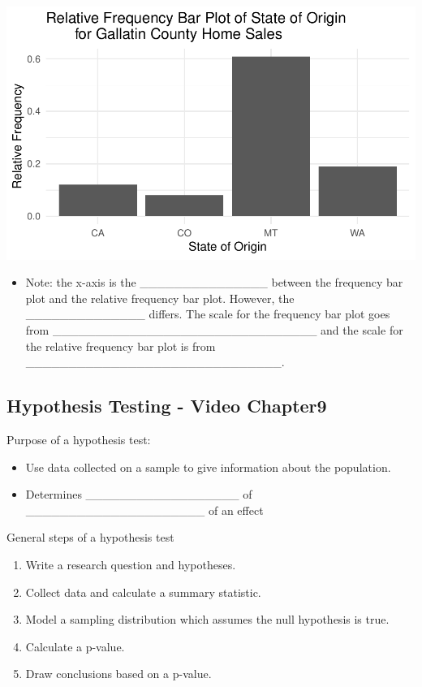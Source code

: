 \documentclass[
]{report}
\providecommand{\tightlist}{%
  \setlength{\itemsep}{0pt}\setlength{\parskip}{0pt}}
\begin{document}
\begin{center}\includegraphics[width=0.65\linewidth]{03-VN03-EDA_OneCatSimulation_files/figure-latex/unnamed-chunk-6-1} \end{center}


\begin{itemize}
\tightlist
\item
  Note: the x-axis is the \_\_\_\_\_\_\_\_\_\_\_\_\_\_\_ between the frequency bar plot and the relative frequency bar plot. However, the \_\_\_\_\_\_\_\_\_\_\_\_\_\_ differs. The scale for the frequency bar plot goes from \_\_\_\_\_\_\_\_\_\_\_\_\_\_\_\_\_\_\_\_\_\_\_\_\_\_\_\_\_\_\_ and the scale for the relative frequency bar plot is from \_\_\_\_\_\_\_\_\_\_\_\_\_\_\_\_\_\_\_\_\_\_\_\_\_\_\_\_\_\_.
\end{itemize}


\subsection*{Hypothesis Testing - Video Chapter9}\label{hypothesis-testing---video-chapter9}

Purpose of a hypothesis test:

\begin{itemize}
\item
  Use data collected on a sample to give information about the population.
\item
  Determines \_\_\_\_\_\_\_\_\_\_\_\_\_\_\_\_\_\_ of \_\_\_\_\_\_\_\_\_\_\_\_\_\_\_\_\_\_\_\_\_ of an effect
\end{itemize}

General steps of a hypothesis test

\begin{enumerate}
\def\labelenumi{\arabic{enumi}.}
\item
  Write a research question and hypotheses.
\item
  Collect data and calculate a summary statistic.
\item
  Model a sampling distribution which assumes the null hypothesis is true.
\item
  Calculate a p-value.
\item
  Draw conclusions based on a p-value.
\end{enumerate}
\end{document}
